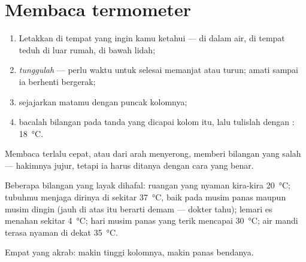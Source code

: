 \section{Membaca termometer}

\begin{method}\label{met:g3:temperature-thermometers:read}
\begin{enumerate}
  \item Letakkan  di tempat yang  ingin kamu ketahui
        --- di dalam air, di tempat teduh di luar rumah, di bawah
        lidah;
  \item \emph{tunggulah} ---  perlu waktu untuk selesai
        memanjat atau turun; amati sampai ia berhenti bergerak;
  \item sejajarkan matamu dengan puncak kolomnya;
  \item bacalah bilangan pada tanda yang dicapai kolom itu, lalu
        tulislah dengan : \qty{18}{\celsius}.
\end{enumerate}
Membaca terlalu cepat, atau dari arah menyerong, memberi bilangan yang
salah --- hakimnya jujur, tetapi ia harus ditanya dengan cara yang
benar.
\end{method}

\begin{example}\label{ex:g3:temperature-thermometers:livedby}
Beberapa bilangan yang layak dihafal: ruangan yang nyaman kira-kira
\qty{20}{\celsius}; tubuhmu menjaga dirinya di sekitar
\qty{37}{\celsius}, baik pada musim panas maupun musim dingin (jauh di
atas itu berarti demam ---  dokter tahu); lemari es menahan
sekitar \qty{4}{\celsius}; hari musim panas yang terik mencapai
\qty{30}{\celsius}; air mandi terasa nyaman di dekat
\qty{35}{\celsius}.
\end{example}

\begin{omfigure}

{\small Empat  yang akrab: makin tinggi kolomnya, makin panas
bendanya.}
\end{omfigure}

